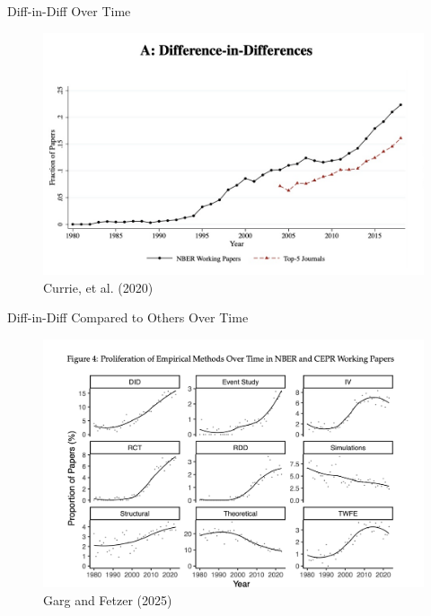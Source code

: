 \documentclass{beamer}
\begin{document}
\begin{frame}{Diff-in-Diff Over Time}

	\begin{figure}
	\caption{Currie, et al. (2020)}
	\includegraphics[scale=0.25]{./lecture_includes/currie_did.png}
	\end{figure}

\end{frame}

\begin{frame}{Diff-in-Diff Compared to Others Over Time}

	\begin{figure}
	\caption{Garg and Fetzer (2025)}
	\includegraphics[scale=0.25]{./lecture_includes/did_growth1}
	\end{figure}

\end{frame}
\end{document}
